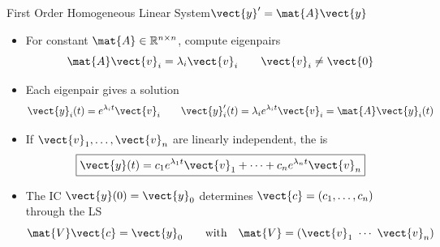 \begin{frame}{First Order Homogeneous Linear System\quad $\vect{y}'=\mat{A}\vect{y}$}
\begin{itemize}
  \item For constant $\mat{A}\in\mathbb{R}^{n\times n}$, compute eigenpairs
  \[
    \mat{A}\vect{v}_i=\lambda_i\vect{v}_i
    \qquad \vect{v}_i\ne\vect{0}
  \]
  \item Each eigenpair gives a solution
  \[
    \vect{y}_i(t)=e^{\lambda_i t}\vect{v}_i
    \qquad
    \vect{y}_i'(t)=\lambda_i e^{\lambda_i t}\vect{v}_i
    =\mat{A}\vect{y}_i(t)
  \]
  \item If $\vect{v}_1,\ldots,\vect{v}_n$ are linearly independent, the  is
  \[
    \boxed{\vect{y}(t)=c_1e^{\lambda_1t}\vect{v}_1+\cdots+c_ne^{\lambda_nt}\vect{v}_n}
  \]
  \item The IC $\vect{y}(0)=\vect{y}_0$ determines $\vect{c}=(c_1,\ldots,c_n)$ through the LS
  \[
    \mat{V}\vect{c}=\vect{y}_0
    \qquad \mbox{with} \quad  \mat{V}=(\vect{v}_1\ \cdots\ \vect{v}_n)
  \]
\end{itemize}
\end{frame}
